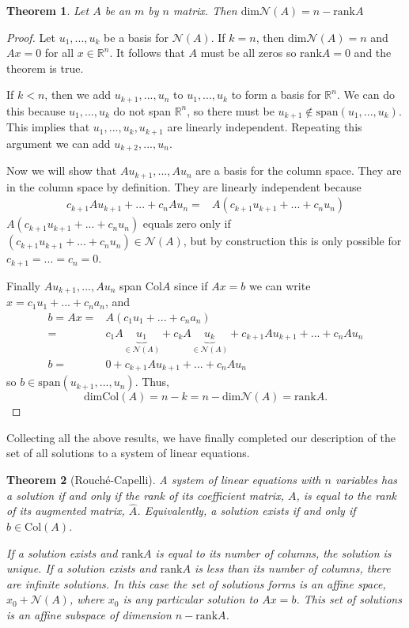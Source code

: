 \documentclass[12pt,reqno]{amsart}
\newtheorem{theorem}{Theorem}[section]
\theoremstyle{definition}
\def\R{\mathbb{R}}
\newcommand{\rank}{\mathrm{rank}}
\newcommand{\spn}{\mathrm{span}}
\newcommand{\col}{\mathrm{Col}}
\renewcommand{\dim}{\mathrm{dim}}
\begin{document}
\begin{theorem}
  Let $A$ be an $m$ by $n$ matrix. Then 
  $\dim \mathcal{N}(A) = n - \rank A$
\end{theorem}
\begin{proof}
  Let $u_1, ..., u_k$ be a basis for $\mathcal{N}(A)$. If $k=n$, then
  $\dim \mathcal{N}(A) = n$ and $A x = 0$ for all $x \in \R^n$. It
  follows that $A$ must be all zeros so $\rank A = 0$ and the theorem
  is true. 

  If $k < n$, then we add $u_{k+1},...,u_n$ to $u_1, ..., u_k$ to form
  a basis for $\R^n$. We can do this because $u_1, ..., u_k$
  do not span $\R^n$, so there must be $u_{k+1} \not\in \spn(u_1, ...,
  u_k)$. This implies that $u_1, ..., u_k, u_{k+1}$ are linearly
  independent. Repeating this argument we can add $u_{k+2}, ...,
  u_n$. 

  Now we will show that  $A u_{k+1}, ..., A u_n$ are a basis for the
  column space. They are in the column space by definition. They are
  linearly independent because
  \begin{align*}
    c_{k+1} A u_{k+1} + ... + c_n A u_{n} = & A (c_{k+1} u_{k+1} +
    ... + c_n u_{n}) 
  \end{align*}
  $A (c_{k+1} u_{k+1} + ... + c_n u_{n})$ equals zero only if $ (c_{k+1} u_{k+1} +
  ... + c_n u_{n}) \in \mathcal{N}(A)$, but by construction this is
  only possible for $c_{k+1} =  ... = c_n = 0$.  

  Finally $A u_{k+1}, ..., A u_n$ span $\col A$ since if $A x = b$ we
  can write $x = c_1 u_1 + ... + c_n a _n$, and
  \begin{align*}
    b = A x = & A \left( c_1 u_1 + ... + c_n a_n \right) \\
    = & c_1 A \underbrace{u_1}_{\in \mathcal{N}(A)} + c_k A
    \underbrace{u_k}_{\in \mathcal{N}(A)} + 
    c_{k+1}Au_{k+1} + ... +c_n A u_n \\
    b = & 0  +     c_{k+1}Au_{k+1} + ... +c_n A u_n 
  \end{align*}
  so $b \in \spn (u_{k+1}, ..., u_n )$. Thus, 
  \[ \dim \col(A) = n-k = n - \dim \mathcal{N}(A) = \rank A. \]
\end{proof}

Collecting all the above results, we have finally completed our
description of the set of all solutions to a system of linear
equations. 
\begin{theorem}[Rouch\'{e}-Capelli] \label{thm:rc} A system of linear
  equations with $n$ variables has a solution if and only if the rank
  of its coefficient matrix, $A$, is equal to the rank of its
  augmented matrix, $\hat{A}$. Equivalently, a solution exists if and
  only if $b \in \col(A)$.

  If a solution exists and $\rank A$ is equal to its number of
  columns, the solution is unique. If a solution exists and $\rank A$
  is less than its number of columns, there are infinite solutions. In
  this case the set of solutions forms is an affine space, $x_0 +
  \mathcal{N}(A)$, where $x_0$ is any particular solution to $A x =
  b$. This set of solutions is an affine subspace of dimension $n -
  \rank A$.
\end{theorem}
\end{document}
